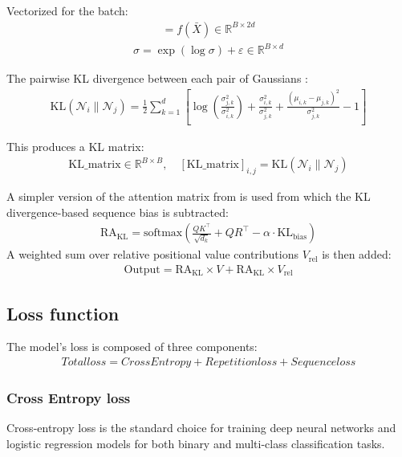 \documentclass[twoside,11pt]{article}
\begin{document}
Vectorized for the batch:
\begin{align}
[\mu, \log \sigma] = f(\bar{X}) \in \mathbb{R}^{B \times 2d}
\end{align}
\begin{align}
\sigma = \exp(\log \sigma) + \varepsilon \in \mathbb{R}^{B \times d}
\end{align}

The pairwise KL divergence between each pair of Gaussians \cite{kldiv}:
\begin{align}
\label{eq:kldiv}
\text{KL}(\mathcal{N}_i \parallel \mathcal{N}_j) =
\frac{1}{2} \sum_{k=1}^{d} \left[
\log\left( \frac{\sigma_{j,k}^2}{\sigma_{i,k}^2} \right) +
\frac{\sigma_{i,k}^2}{\sigma_{j,k}^2} +
\frac{(\mu_{i,k} - \mu_{j,k})^2}{\sigma_{j,k}^2} - 1
\right]
\end{align}

This produces a KL matrix:
\begin{align}
\text{KL\_matrix} \in \mathbb{R}^{B \times B}, \quad
[\text{KL\_matrix}]_{i,j} = \text{KL}(\mathcal{N}_i \parallel \mathcal{N}_j)
\end{align}

A simpler version of the attention matrix from \cite{XL} is used from which the KL divergence-based sequence bias is subtracted:
\begin{align}
\text{RA}_{\text{KL}} = \text{softmax} \left( \frac{Q K^\top}{\sqrt{d_k}} + Q R^\top - \alpha \cdot \text{KL}_{\text{bias}} \right)
\end{align}
A weighted sum over relative positional value contributions $V_{\text{rel}}$ is then added:
\begin{align}
\text{Output} = \text{RA}_{\text{KL}} \times V + \text{RA}_{\text{KL}} \times V_{\text{rel}}
\end{align}
\subsection{Loss function}
The model's loss is composed of three components:
\begin{align}
Totalloss=CrossEntropy + Repetition loss + Sequence loss
\end{align}
\subsubsection{Cross Entropy loss}
Cross-entropy loss is the standard choice for training deep neural networks and logistic regression models for both binary and multi-class classification tasks. \cite{mlglossary}
\end{document}
